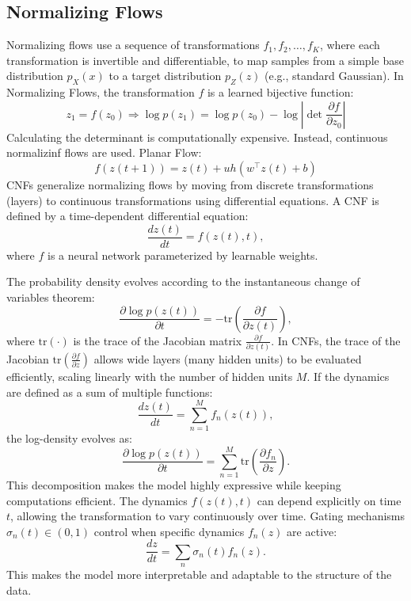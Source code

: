 \documentclass[12pt]{article}
\begin{document}
\subsection{Normalizing Flows}
Normalizing flows use a sequence of transformations \(f_1, f_2, \ldots, f_K\), where each transformation is invertible and differentiable, to map samples from a simple base distribution \(p_X(x)\) to a target distribution \(p_Z(z)\) (e.g., standard Gaussian).
In Normalizing Flows, the transformation $f$ is a learned bijective function:
\[
    z_1 = f(z_0) \Rightarrow \log p(z_1) = \log p(z_0) - \log \left| \det \frac{\partial f}{\partial z_0} \right|
\]
Calculating the determinant is computationally expensive. Instead, continuous normalizinf flows are used. Planar Flow:
\[
    f(z(t+1)) = z(t) + uh(w^\top z(t) + b)
\]
CNFs generalize normalizing flows by moving from discrete transformations (layers) to continuous transformations using differential equations. 
A CNF is defined by a time-dependent differential equation:
\[
\frac{dz(t)}{dt} = f(z(t), t),
\]
where \( f \) is a neural network parameterized by learnable weights.

The probability density evolves according to the instantaneous change of variables theorem:
\[
\frac{\partial \log p(z(t))}{\partial t} = -\mathrm{tr}\left(\frac{\partial f}{\partial z(t)}\right),
\]
where \(\mathrm{tr}(\cdot)\) is the trace of the Jacobian matrix \(\frac{\partial f}{\partial z(t)}\). 
In CNFs, the trace of the Jacobian \(\mathrm{tr}\left(\frac{\partial f}{\partial z}\right)\) allows wide layers (many hidden units) to be evaluated efficiently, scaling linearly with the number of hidden units \(M\).
If the dynamics are defined as a sum of multiple functions:
\[
\frac{dz(t)}{dt} = \sum_{n=1}^{M} f_n(z(t)),
\]
the log-density evolves as:
\[
\frac{\partial \log p(z(t))}{\partial t} = \sum_{n=1}^{M} \mathrm{tr}\left(\frac{\partial f_n}{\partial z}\right).
\]
This decomposition makes the model highly expressive while keeping computations efficient.
The dynamics \(f(z(t), t)\) can depend explicitly on time \(t\), allowing the transformation to vary continuously over time.
Gating mechanisms \(\sigma_n(t) \in (0, 1)\) control when specific dynamics \(f_n(z)\) are active:
\[
\frac{dz}{dt} = \sum_{n} \sigma_n(t) f_n(z).
\]
This makes the model more interpretable and adaptable to the structure of the data. 
\end{document}
